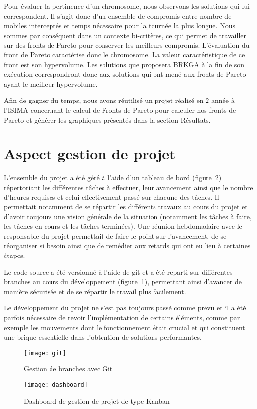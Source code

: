 			Pour évaluer la pertinence d'un chromosome, nous observons les solutions qui lui correspondent. Il s'agit donc d'un ensemble de compromis entre nombre de mobiles interceptés et temps nécessaire pour la tournée la plus longue. Nous sommes par conséquent dans un contexte bi-critères, ce qui permet de travailler sur des fronts de Pareto pour conserver les meilleurs compromis. L'évaluation du front de Pareto caractérise donc le chromosome. La valeur caractéristique de ce front est son hypervolume. Les solutions que proposera BRKGA à la fin de son exécution correspondront donc aux solutions qui ont mené aux fronts de Pareto ayant le meilleur hypervolume.

			Afin de gagner du temps, nous avons réutilisé un projet réalisé en 2\ieme{} année à l'ISIMA concernant le calcul de Fronts de Pareto \cite{projet-zz2} pour calculer nos fronts de Pareto et générer les graphiques présentés dans la section Résultats.

	\section{Aspect gestion de projet}

		L'ensemble du projet a été géré à l'aide d'un tableau de bord (figure~\ref{fig:dashboard}) répertoriant les différentes tâches à effectuer, leur avancement ainsi que le nombre d'heures requises et celui effectivement passé sur chacune des tâches. Il permettait notamment de se répartir les différents travaux au cours du projet et d'avoir toujours une vision générale de la situation (notamment les tâches à faire, les tâches en cours et les tâches terminées). Une réunion hebdomadaire avec le responsable du projet permettait de faire le point sur l'avancement, de se réorganiser si besoin ainsi que de remédier aux retards qui ont eu lieu à certaines étapes. 
		
		Le code source a été versionné à l'aide de git et a été reparti sur différentes branches au cours du développement (figure~\ref{fig:git}), permettant ainsi d'avancer de manière sécurisée et de se répartir le travail plus facilement.
		
		Le développement du projet ne s'est pas toujours passé comme prévu et il a été parfois nécessaire de revoir l'implémentation de certains éléments, comme par exemple les mouvements dont le fonctionnement était crucial et qui constituent une brique essentielle dans l'obtention de solutions performantes.
		
		\begin{figure}[h!]
			\centering
			\texttt{[image: git]}
			\caption{Gestion de branches avec Git}
			\label{fig:git}
		\end{figure}

		\begin{figure}[h!]
			\centering
			\texttt{[image: dashboard]}
			\caption{Dashboard de gestion de projet de type Kanban}
			\label{fig:dashboard}
		\end{figure}

